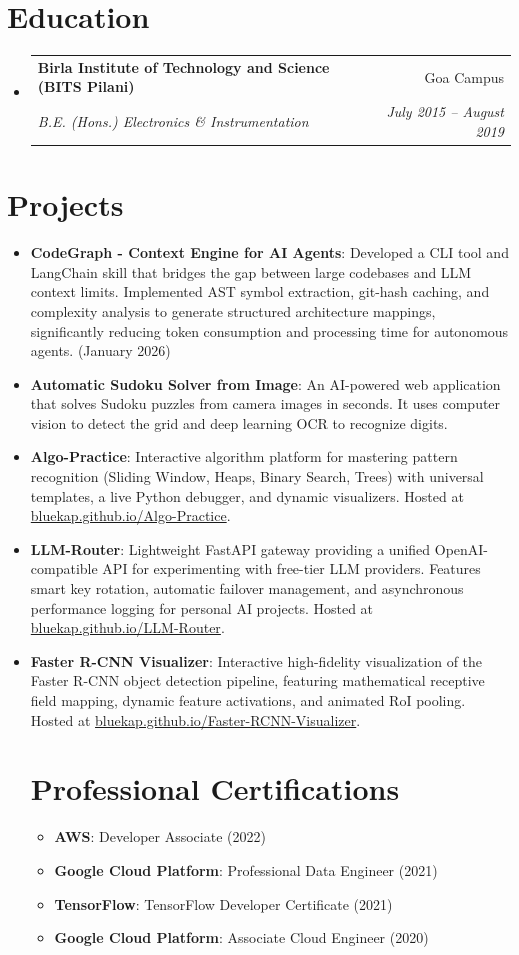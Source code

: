 \documentclass[a4paper,20pt]{article}
\makeatletter
\newcommand{\resumeItem}[2]{
  \item\small{
    \textbf{#1}{: #2 \vspace{-2pt}}
  }
}
\newcommand{\resumeSubheading}[4]{
  \vspace{-1pt}\item
    \begin{tabular*}{0.97\textwidth}{l@{\extracolsep{\fill}}r}
      \textbf{#1} & #2 \\
      \textit{#3} & \textit{#4} \\
    \end{tabular*}\vspace{-5pt}
}
\newcommand{\resumeSubItem}[2]{\resumeItem{#1}{#2}\vspace{-3pt}}
\newcommand{\resumeSubHeadingListStart}{\begin{itemize}[leftmargin=*]}
\newcommand{\resumeSubHeadingListEnd}{\end{itemize}}
\makeatother
\begin{document}
\vspace{-5pt}
\section{Education}
\resumeSubHeadingListStart
\resumeSubheading
  {Birla Institute of Technology and Science (BITS Pilani)}{Goa Campus}
  {B.E. (Hons.) Electronics \& Instrumentation}{July 2015 -- August 2019}
\resumeSubHeadingListEnd

\vspace{-5pt}
\section{Projects}
\resumeSubHeadingListStart
\resumeSubItem{CodeGraph - Context Engine for AI Agents}{
Developed a CLI tool and LangChain skill that bridges the gap between large codebases and LLM context limits. Implemented AST symbol extraction, git-hash caching, and complexity analysis to generate structured architecture mappings, significantly reducing token consumption and processing time for autonomous agents. (January 2026)}
\resumeSubItem{Automatic Sudoku Solver from Image}
{An AI-powered web application that solves Sudoku puzzles from camera images in seconds. It uses computer vision to detect the grid and deep learning OCR to recognize digits.}
\resumeSubItem{Algo-Practice}
{Interactive algorithm platform for mastering pattern recognition (Sliding Window, Heaps, Binary Search, Trees) with universal templates, a live Python debugger, and dynamic visualizers. Hosted at \href{https://bluekap.github.io/Algo-Practice}{bluekap.github.io/Algo-Practice}.}
\resumeSubItem{LLM-Router}
{Lightweight FastAPI gateway providing a unified OpenAI-compatible API for experimenting with free-tier LLM providers. Features smart key rotation, automatic failover management, and asynchronous performance logging for personal AI projects. Hosted at \href{https://bluekap.github.io/LLM-Router}{bluekap.github.io/LLM-Router}.}
\resumeSubItem{Faster R-CNN Visualizer}
{Interactive high-fidelity visualization of the Faster R-CNN object detection pipeline, featuring mathematical receptive field mapping, dynamic feature activations, and animated RoI pooling. Hosted at \href{https://bluekap.github.io/Faster-RCNN-Visualizer}{bluekap.github.io/Faster-RCNN-Visualizer}.}
\vspace{2pt}


\vspace{-5pt}
\section{Professional Certifications}
\resumeSubHeadingListStart
\resumeSubItem{AWS}{Developer Associate (2022)}
\resumeSubItem{Google Cloud Platform}{Professional Data Engineer (2021)}
\resumeSubItem{TensorFlow}{TensorFlow Developer Certificate (2021)}
\resumeSubItem{Google Cloud Platform}{Associate Cloud Engineer (2020)}
\resumeSubHeadingListEnd
\resumeSubHeadingListEnd
\end{document}
